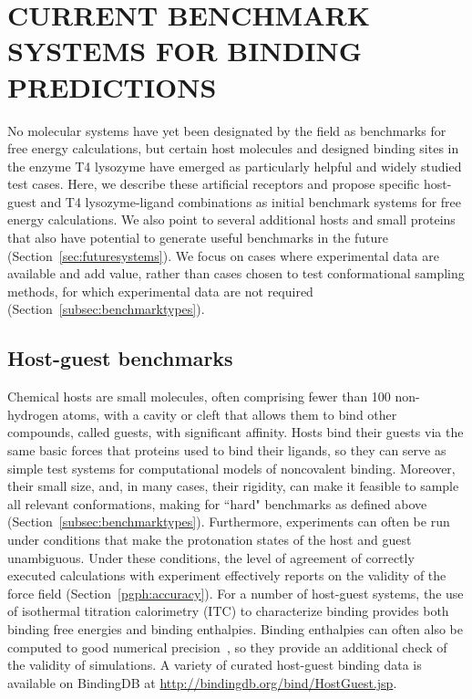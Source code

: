 \documentclass[aps,pre,twocolumn,nofootinbib,superscriptaddress,10pt, final,tightenlines]{revtex4-1}
\begin{document}
\section{CURRENT BENCHMARK SYSTEMS FOR BINDING PREDICTIONS}
\label{benchmarks}
No molecular systems have yet been designated by the field as benchmarks for free energy calculations, but certain host molecules and designed binding sites in the enzyme T4 lysozyme have emerged as particularly helpful and widely studied test cases. 
Here, we describe these artificial receptors and propose specific host-guest and T4 lysozyme-ligand combinations as initial benchmark systems for free energy calculations. 
We also point to several additional hosts and small proteins that also have potential to generate useful benchmarks in the future (Section~\ref{sec:futuresystems}). 
We focus on cases where experimental data are available and add value, rather than cases chosen to test conformational sampling methods, for which experimental data are not required (Section~\ref{subsec:benchmarktypes}). 

\subsection{Host-guest benchmarks}
\label{sec:hgbenchmarks}
Chemical hosts are small molecules, often comprising fewer than 100 non-hydrogen atoms, with a cavity or cleft that allows them to bind other compounds, called guests, with significant affinity.  
Hosts bind their guests via the same basic forces that proteins used to bind their ligands, so they can serve as simple test systems for computational models of noncovalent binding. 
Moreover, their small size, and, in many cases, their rigidity, can make it feasible to sample all relevant conformations, making for ``hard" benchmarks as defined above (Section~\ref{subsec:benchmarktypes}).  
Furthermore, experiments can often be run under conditions that make the protonation states of the host and guest unambiguous. 
Under these conditions, the level of agreement of correctly executed calculations with experiment effectively reports on the validity of the force field (Section~\ref{pgph:accuracy}). 
For a number of host-guest systems, the use of isothermal titration calorimetry (ITC) to characterize binding provides both binding free energies and binding enthalpies. 
Binding enthalpies can often also be computed to good numerical precision~\cite{henriksen_computational_2015}, so they provide an additional check of the validity of simulations.
A variety of curated host-guest binding data is available on BindingDB at \url{http://bindingdb.org/bind/HostGuest.jsp}.
\end{document}
